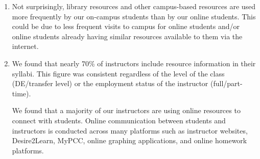 \begin{enumerate}[label=Q\arabic*.,font=\bf]
	\item Not surprisingly, library resources and other campus-based resources
	      are used more frequently by our on-campus students than by our online
	      students.
	      This could be due to less frequent visits to campus for online students and/or online students already having similar resources available to them via the internet.
	\item We found that nearly 70\% of instructors include resource information
	      in their syllabi.
	      This figure was consistent regardless of the level of the class (DE/transfer level) or the employment status of the instructor (full/part-time).

	      We found that a majority of our instructors are using online resources to connect with students.
	      Online communication between students and instructors is conducted across many platforms such as instructor websites, Desire2Learn, MyPCC, online graphing applications, and online homework platforms.


\end{enumerate}

